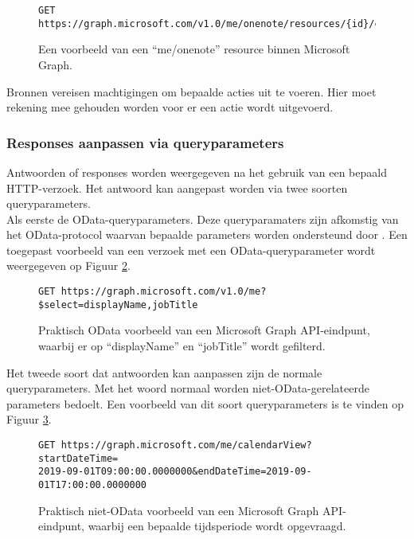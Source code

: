 \begin{figure}[h]
    \footnotesize\begin{verbatim}GET https://graph.microsoft.com/v1.0/me/onenote/resources/{id}/content
    \end{verbatim}    
    \caption[Voorbeeld Microsoft Graph resource]{Een voorbeeld van een “me/onenote” resource binnen Microsoft Graph.}
    \label{MSGR}
\end{figure}

Bronnen vereisen machtigingen om bepaalde acties uit te voeren. Hier moet rekening mee gehouden worden voor er een actie wordt uitgevoerd.

\subsubsection{Responses aanpassen via queryparameters}

Antwoorden of responses worden weergegeven na het gebruik van een bepaald HTTP-verzoek. Het antwoord kan aangepast worden via twee soorten queryparameters. \\

Als eerste de OData-queryparameters. Deze queryparamaters zijn afkomstig van het OData-protocol waarvan bepaalde parameters worden ondersteund door \textcite{Microsoft2023g}. Een toegepast voorbeeld van een verzoek met een OData-queryparameter wordt weergegeven op Figuur \ref{TRAM}. \\

\begin{figure}[h]
    \footnotesize\begin{verbatim}GET https://graph.microsoft.com/v1.0/me?$select=displayName,jobTitle
    \end{verbatim}    
    \caption[Voorbeeld OData HTTP-verzoek]{Praktisch OData voorbeeld van een Microsoft Graph \Ac{API}-eindpunt, waarbij er op “displayName” en “jobTitle” wordt gefilterd.}
    \label{TRAM}
\end{figure}

Het tweede soort dat antwoorden kan aanpassen zijn de normale queryparameters. Met het woord normaal worden niet-OData-gerelateerde parameters bedoelt. Een voorbeeld van dit soort queryparameters is te vinden op Figuur \ref{NRAM}. \\

\begin{figure}[h]
    \footnotesize\begin{verbatim}GET https://graph.microsoft.com/me/calendarView?startDateTime=
2019-09-01T09:00:00.0000000&endDateTime=2019-09-01T17:00:00.0000000
    \end{verbatim}    
    \caption[Voorbeeld niet-OData HTTP-verzoek]{Praktisch niet-OData voorbeeld van een Microsoft Graph \Ac{API}-eindpunt, waarbij een bepaalde tijdsperiode wordt opgevraagd.}
    \label{NRAM}
\end{figure}

